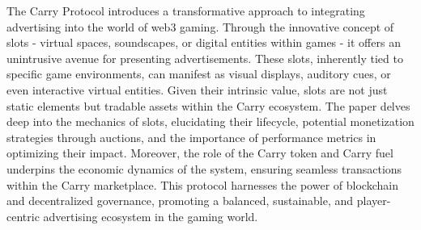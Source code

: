 \documentclass[
10pt, %
a4paper, %
oneside, %
headinclude,footinclude, %
BCOR5mm, %
]{scrartcl}
\begin{document}
The Carry Protocol introduces a transformative approach to integrating advertising into the world of web3 gaming. Through the innovative concept of slots - virtual spaces, soundscapes, or digital entities within games - it offers an unintrusive avenue for presenting advertisements. These slots, inherently tied to specific game environments, can manifest as visual displays, auditory cues, or even interactive virtual entities. Given their intrinsic value, slots are not just static elements but tradable assets within the Carry ecosystem. The paper delves deep into the mechanics of slots, elucidating their lifecycle, potential monetization strategies through auctions, and the importance of performance metrics in optimizing their impact. Moreover, the role of the Carry token and Carry fuel underpins the economic dynamics of the system, ensuring seamless transactions within the Carry marketplace. This protocol harnesses the power of blockchain and decentralized governance, promoting a balanced, sustainable, and player-centric advertising ecosystem in the gaming world.






\newpage %




% 

\end{document}
